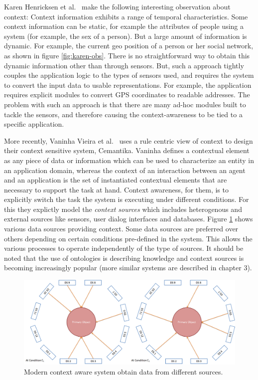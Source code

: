 Karen Henricksen et al.\ \cite{henricksen2002modeling} make the following interesting observation about context: Context information exhibits a range of temporal characteristics. Some context information can be static, for example the attributes of people using a system (for example, the sex of a person). But a large amount of information is dynamic. For example, the current geo position of a person or her social network, as shown in figure \ref{fig:karen-obs}. There is no straightforward way to obtain this dynamic information other than through sensors. But, such a approach tightly couples the application logic to the types of sensors used, and requires the system to convert the input data to usable representations. For example, the application requires explicit modules to convert GPS coordinates to readable addresses. The problem with such an approach is that there are many ad-hoc modules built to tackle the sensors, and therefore causing the context-awareness to be tied to a specific application.

More recently, Vaninha Vieira et al.\ \cite{vieira2011designing} uses a rule centric view of context to design their context sensitive system, Cemantika. Vaninha defines a contextual element as any piece of data or information which can be used to characterize an entity in an application domain, whereas the context of an interaction between an agent and an application is the set of instantiated contextual elements that are necessary to support the task at hand. Context awareness, for them, is to explicitly switch the task the system is executing under different conditions. For this they explictly model the \textit{context sources} which includes heterogenous and  external sources like sensors, user dialog interfaces and databases. Figure \ref{fig:va-def} shows various data sources providing context. Some data sources are preferred over others depending on certain conditions pre-defined in the system. This allows the various processes to operate independently of the type of sources. It should be noted that the use of ontologies is describing knowledge and context sources is becoming increasingly popular (more similar systems are described in chapter 3).

\begin{figure}[t]
\centering
\includegraphics[width=\textwidth]{media/chapter2/va.png}
\caption{Modern context aware system obtain data from different sources.}
\label{fig:va-def}
\end{figure}

